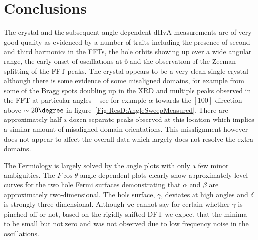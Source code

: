 
\section{Conclusions}

The \BaFeP{} crystal and the subsequent angle dependent \ac{dHvA} measurements are of very good quality as evidenced by a number of traits including the presence of second and third harmonics in the \acp{FFT}, the hole orbits showing up over a wide angular range, the early onset of oscillations at \unit{6}{\tesla} and the observation of the Zeeman splitting of the \ac{FFT} peaks. The crystal appears to be a very clean single crystal although there is some evidence of some misaligned domains, for example from some of the Bragg spots doubling up in the \ac{XRD} and multiple peaks observed in the \ac{FFT} at particular angles -- see for example $\alpha$ towards the $[100]$ direction above $\sim 20\degree$ in figure~\ref{Fig:ResD:AngleSweepMeasured}. There are approximately half a dozen separate peaks observed at this location which implies a similar amount of misaligned domain orientations. This misalignment however does not appear to affect the overall data which largely does not resolve the extra domains.

The Fermiology is largely solved by the angle plots with only a few minor ambiguities.  The $F\cos \theta$ angle dependent plots clearly show approximately level curves for the two hole Fermi surfaces demonstrating that $\alpha$ and $\beta$ are approximately two-dimensional. The hole surface, $\gamma$, deviates at high angles and $\delta$ is strongly three dimensional. Although we cannot say for certain whether $\gamma$ is pinched off or not, based on the rigidly shifted \ac{DFT} we expect that the minima to be small but not zero and was not observed due to low frequency noise in the oscillations.

